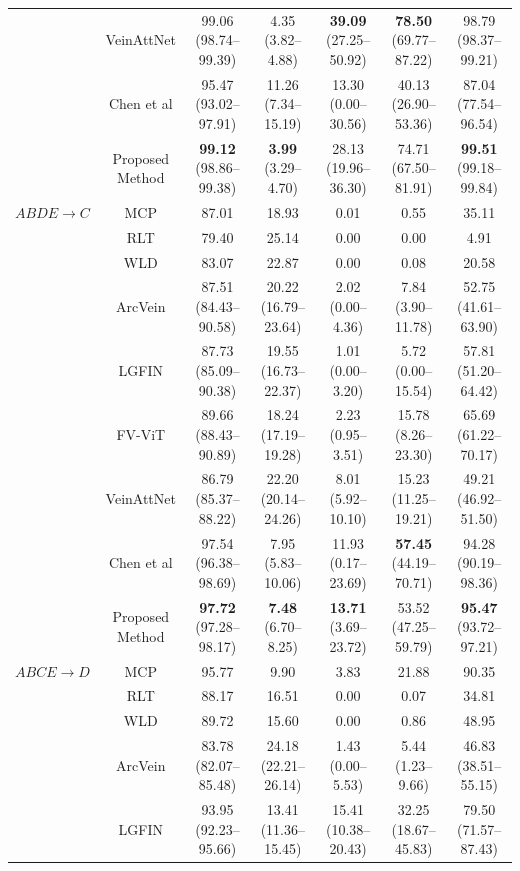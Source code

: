 \documentclass[11pt]{article}
\begin{document}
\begin{table}[ht!]
{\begin{tabular}{|c|c|c|c|c|c|c|}
         & VeinAttNet & 99.06 (98.74--99.39) & 4.35 (3.82--4.88) & \textbf{39.09} (27.25--50.92) & \textbf{78.50} (69.77--87.22) & 98.79 (98.37--99.21) \\
         & Chen et al & 95.47 (93.02--97.91) & 11.26 (7.34--15.19) & 13.30 (0.00--30.56) & 40.13 (26.90--53.36) & 87.04 (77.54--96.54) \\
         & Proposed Method & \textbf{99.12} (98.86--99.38) & \textbf{3.99} (3.29--4.70) & 28.13 (19.96--36.30) & 74.71 (67.50--81.91) & \textbf{99.51} (99.18--99.84) \\
        \hline
        $ABDE \rightarrow C$ & MCP & 87.01 & 18.93 & 0.01 & 0.55 & 35.11 \\
         & RLT & 79.40 & 25.14 & 0.00 & 0.00 & 4.91 \\
         & WLD & 83.07 & 22.87 & 0.00 & 0.08 & 20.58 \\
         & ArcVein & 87.51 (84.43--90.58) & 20.22 (16.79--23.64) & 2.02 (0.00--4.36) & 7.84 (3.90--11.78) & 52.75 (41.61--63.90) \\
         & LGFIN & 87.73 (85.09--90.38) & 19.55 (16.73--22.37) & 1.01 (0.00--3.20) & 5.72 (0.00--15.54) & 57.81 (51.20--64.42) \\
         & FV-ViT & 89.66 (88.43--90.89) & 18.24 (17.19--19.28) & 2.23 (0.95--3.51) & 15.78 (8.26--23.30) & 65.69 (61.22--70.17) \\
         & VeinAttNet & 86.79 (85.37--88.22) & 22.20 (20.14--24.26) & 8.01 (5.92--10.10) & 15.23 (11.25--19.21) & 49.21 (46.92--51.50) \\
         & Chen et al & 97.54 (96.38--98.69) & 7.95 (5.83--10.06) & 11.93 (0.17--23.69) & \textbf{57.45} (44.19--70.71) & 94.28 (90.19--98.36) \\
         & Proposed Method & \textbf{97.72} (97.28--98.17) & \textbf{7.48} (6.70--8.25) & \textbf{13.71} (3.69--23.72) & 53.52 (47.25--59.79) & \textbf{95.47} (93.72--97.21) \\
        \hline
        $ABCE \rightarrow D$ & MCP & 95.77 & 9.90 & 3.83 & 21.88 & 90.35 \\
         & RLT & 88.17 & 16.51 & 0.00 & 0.07 & 34.81 \\
         & WLD & 89.72 & 15.60 & 0.00 & 0.86 & 48.95 \\
         & ArcVein & 83.78 (82.07--85.48) & 24.18 (22.21--26.14) & 1.43 (0.00--5.53) & 5.44 (1.23--9.66) & 46.83 (38.51--55.15) \\
         & LGFIN & 93.95 (92.23--95.66) & 13.41 (11.36--15.45) & 15.41 (10.38--20.43) & 32.25 (18.67--45.83) & 79.50 (71.57--87.43) \\

\end{tabular}}
\end{table}
\end{document}
